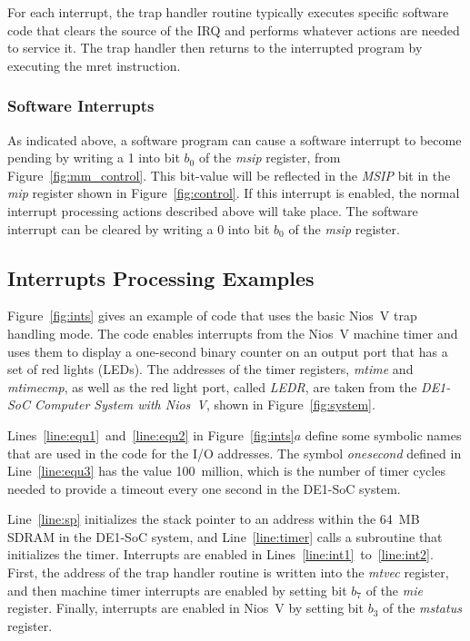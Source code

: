 \documentclass[11pt, twoside, pdftex]{article}
\begin{document}
For each interrupt, the trap handler routine typically executes specific software code that
clears the source of the IRQ and performs whatever actions are needed to service it. The trap 
handler then returns to the interrupted program by executing the {\sf mret} instruction. 

\subsubsection{Software Interrupts}
\label{sec:swi}

As indicated above, a software program can cause a software interrupt to become pending by
writing a 1 into bit $b_0$ of the {\it msip} register, from Figure~\ref{fig:mm_control}.
This bit-value will be reflected in the {\it MSIP} bit in the {\it mip} register shown 
in Figure~\ref{fig:control}. If this interrupt is enabled, the normal interrupt processing 
actions described above will take place. The software interrupt can be cleared by writing a 0 
into bit $b_0$ of the {\it msip} register.

\subsection{Interrupts Processing Examples}
\label{sec:modes}

Figure~\ref{fig:ints} gives an example of code that uses the basic Nios~V trap handling mode.
The code
enables interrupts from the Nios~V machine timer and uses them to display a one-second binary
counter on an output port that has a set of red lights (LEDs). The addresses of the timer
registers, {\it mtime} and {\it mtimecmp}, as well as the red light port, called {\it LEDR},
are taken from the {\it DE1-SoC Computer System with Nios~V}, shown in
Figure~\ref{fig:system}. 

Lines~\ref{line:equ1}~and~\ref{line:equ2} in Figure~\ref{fig:ints}$a$ define some symbolic 
names that are used in the code for the I/O addresses. The symbol {\it onesecond}
defined in Line~\ref{line:equ3} has the value 100~million, which is the number of timer 
cycles needed to provide a timeout every one second in the DE1-SoC system.

Line~\ref{line:sp} initializes the stack pointer to an address within the 64~MB SDRAM 
in the DE1-SoC system, and Line~\ref{line:timer} calls a subroutine that initializes the timer. 
Interrupts are enabled in Lines~\ref{line:int1}~to~\ref{line:int2}. First, the address of
the trap handler routine is written into the {\it mtvec} register, and then machine timer 
interrupts are enabled by setting bit $b_7$ of the {\it mie} register. Finally, interrupts 
are enabled in Nios~V by setting bit $b_3$ of the {\it mstatus} register.
\end{document}
